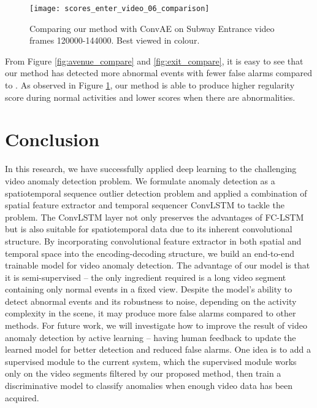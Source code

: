 \documentclass[a4paper]{article}
\begin{document}
\begin{figure}
	\centering
	\texttt{[image: scores\_enter\_video\_06\_comparison]}
	\caption{Comparing our method with ConvAE \cite{hasan2016} on Subway Entrance video frames 120000-144000. Best viewed in colour.}
	\label{fig:enter_compare}
\end{figure}

From Figure \ref{fig:avenue_compare} and \ref{fig:exit_compare}, it is easy to see that our method has detected more abnormal events with fewer false alarms compared to \cite{hasan2016}. As observed in Figure \ref{fig:enter_compare}, our method is able to produce higher regularity score during normal activities and lower scores when there are abnormalities.

\section{Conclusion}

In this research, we have successfully applied deep learning to the challenging video anomaly detection problem. We formulate anomaly detection as a spatiotemporal sequence outlier detection problem and applied a combination of spatial feature extractor and temporal sequencer ConvLSTM to tackle the problem. The ConvLSTM layer not only preserves the advantages of FC-LSTM but is also suitable for spatiotemporal data due to its inherent convolutional structure. By incorporating convolutional feature extractor in both spatial and temporal space into the encoding-decoding structure, we build an end-to-end trainable model for video anomaly detection. The advantage of our model is that it is semi-supervised -- the only ingredient required is a long video segment containing only normal events in a fixed view. Despite the model’s ability to detect abnormal events and its robustness to noise, depending on the activity complexity in the scene, it may produce more false alarms compared to other methods. For future work, we will investigate how to improve the result of video anomaly detection by active learning -- having human feedback to update the learned model for better detection and reduced false alarms. One idea is to add a supervised module to the current system, which the supervised module works only on the video segments filtered by our proposed method, then train a discriminative model to classify anomalies when enough video data has been acquired.

 

\end{document}

